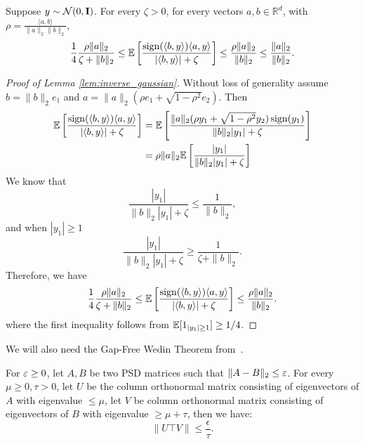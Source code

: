 \begin{lemma}\label{lem:inverse_gaussian}
Suppose $y \sim \mathcal{N}(0, \bold{I})$. For every $\zeta > 0$, for every vectors $a, b \in \mathbb{R}^d$, with $\rho = \frac{\langle a, b \rangle}{\|a\|_2 \|b\|_2}$,
$$ 
  \frac{1}{4}\frac{\rho \|a\|_2}{\zeta + \|b\|_2}  \leq \mathbb{E}\left[\frac{\operatorname*{sign}(\langle b, y \rangle)\langle a , y \rangle}{| \langle b, y \rangle |+ \zeta} \right]  \leq \frac{\rho \|a\|_2}{\|b\|_2} \leq \frac{ \|a\|_2}{\|b\|_2}.
$$
\end{lemma}


\begin{proof}[Proof of Lemma \ref{lem:inverse_gaussian}]
Without loss of generality assume $b = \|b\|_2 e_1$ and $a =  \|a\|_2 (\rho e_1 + \sqrt{1 - \rho^2} e_2 )$. Then 
\begin{align*}
\mathbb{E}\left[\frac{\operatorname*{sign}(\langle b, y \rangle)\langle a , y \rangle}{| \langle b, y \rangle |+ \zeta} \right]&= \mathbb{E}\left[\frac{ \|a\|_2 (\rho y_1+ \sqrt{1 - \rho^2} y_2 ) \operatorname*{sign}(y_1)}{ \| b\|_2 |y_1| + \zeta} \right] 
\\
& = \rho \|a\|_2 \mathbb{E}\left[ \frac{|y _1|}{\|b\|_2 |y_1 |+ \zeta} \right]
\end{align*}
We know that 
$$  
  \frac{|y _1|}{\|b\|_2 |y_1 |+ \zeta} \leq \frac{1}{\|b\|_2},
$$
and when $|y_1| \ge 1$
$$
  \frac{|y _1|}{\|b\|_2 |y_1 |+ \zeta} \ge \frac{1}{\zeta + \|b\|_2}.
$$
Therefore, we have
$$ \frac{1}{4}\frac{\rho \|a\|_2}{\zeta + \|b\|_2}  \leq \mathbb{E}\left[\frac{\operatorname*{sign}(\langle b, y \rangle)\langle a , y \rangle}{| \langle b, y \rangle |+ \zeta} \right]  \leq \frac{\rho \|a\|_2}{\|b\|_2}.
$$
where the first inequality follows from $\mathbb{E}[1_{|y_1| \ge 1}] \ge 1/4$.
\end{proof}

We will also need the Gap-Free Wedin Theorem from~\citep{allen2016lazysvd}. 

\begin{lemma} \label{lem:gapfree_wedin}
For $\varepsilon \ge 0$, let $A, B$ be two PSD matrices such that $\|A - B\|_2 \le \varepsilon$. For every $\mu \ge 0, \tau > 0$, let $U$ be the column orthonormal matrix consisting of eigenvectors of $A$ with eigenvalue $\le \mu$, let $V$ be column orthonormal matrix consisting of eigenvectors of $B$ with eigenvalue $\ge \mu + \tau$, then we have:
$$
  \| U\top V\| \le \frac{\epsilon}{\tau}.
$$
\end{lemma}
